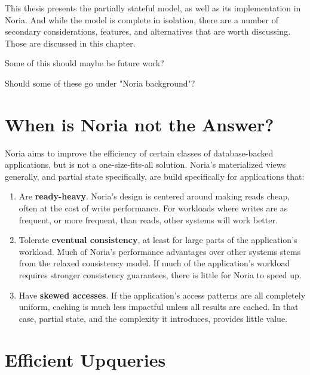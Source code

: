 This thesis presents the partially stateful model, as well as its implementation
in Noria. And while the model is complete in isolation, there are a number of
secondary considerations, features, and alternatives that are worth discussing.
Those are discussed in this chapter.

\begin{inprogress}
Some of this should maybe be future work?
\end{inprogress}

\begin{inprogress}
Should some of these go under "Noria background"?
\end{inprogress}

\section{When is Noria not the Answer?}

Noria aims to improve the efficiency of certain classes of database-backed
applications, but is not a one-size-fits-all solution. Noria's materialized
views generally, and partial state specifically, are build specifically for
applications that:

\begin{enumerate}
  \item Are \textbf{ready-heavy}. Noria's design is centered around making reads
    cheap, often at the cost of write performance. For workloads where writes
    are as frequent, or more frequent, than reads, other systems will work
    better.
  \item Tolerate \textbf{eventual consistency}, at least for large parts of the
    application's workload. Much of Noria's performance advantages over other
    systems stems from the relaxed consistency model. If much of the
    application's workload requires stronger consistency guarantees, there is
    little for Noria to speed up.
  \item Have \textbf{skewed accesses}. If the application's access patterns are
    all completely uniform, caching is much less impactful unless all results
    are cached. In that case, partial state, and the complexity it introduces,
    provides little value.
\end{enumerate}

\section{Efficient Upqueries}

